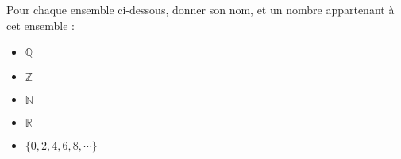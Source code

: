 \documentclass{automatisme}
\begin{document}
\begin{frame}
	Pour chaque ensemble ci-dessous, donner son nom, et un nombre appartenant à cet ensemble :

		\begin{itemize}\setlength\itemsep{1.5em}
			\item $ℚ$
			\item $ℤ$
			\item $ℕ$
			\item $ℝ$
			\item $\{0, 2, 4, 6, 8, ⋯\}$
		\end{itemize}
\end{frame}
\end{document}
